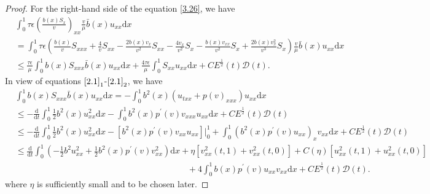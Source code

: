 \documentclass[10pt,reqno]{amsart}
\numberwithin{equation}{section}
\newcommand{\dif}{\mathrm{d}}
\begin{document}
\begin{proof}
For the right-hand side of the equation \eqref{3.26}, we have
\begin{align*}
&\int_0^1 \tau \epsilon \left(\frac{b(x)S_x}{v}\right)_{xx} \frac{v}{\mu} \bar b(x)u_{xx}\dif x \\
&=\int_0^1 \tau \epsilon \left( \frac{b(x)}{v}S_{xxx}+\frac{4}{v} S_{xx}-\frac{2 b(x) v_x}{v^2}S_{xx}-\frac{4v_x}{v^2}S_x-\frac{b(x)v_{xx}}{v^2}S_x+\frac{2 b(x)v_x^2}{v^3} S_x\right)\frac{v}{\mu} \bar b(x)u_{xx}\dif x\\
&\le \frac{\tau \epsilon}{\mu} \int_0^1 b(x) S_{xxx} \bar b(x) u_{xx} \dif x +\frac{4\tau \epsilon}{\mu} \int_0^1 S_{xx} u_{xx} \dif x +CE^\frac{1}{2}(t)\mathcal D(t).
\end{align*}
In view of  equations $\eqref{2.1}_1$-$\eqref{2.1}_2$, we have
\begin{align*}
&\int_0^1 b(x) S_{xxx} \bar b(x) u_{xx}\dif x=-\int_0^1 b^2(x)(u_{txx}+p(v)_{xxx})u_{xx}\dif x\\
&\le -\frac{\dif}{\dif t}\int_0^1 \frac{1}{2}b^2(x) u_{xx}^2\dif x-\int_0^1 b^2(x)p^\prime(v) v_{xxx}u_{xx} \dif x+CE^\frac{1}{2}(t)\mathcal D(t)\\
&\le -\frac{\dif}{\dif t} \int_0^1 \frac{1}{2} b^2(x)u_{xx}^2 \dif x-\left[b^2(x)p^\prime(v) v_{xx}u_{xx} \right]\big|_0^1+\int_0^1 (b^2(x)p^\prime(v) u_{xx})_x v_{xx}\dif x +CE^\frac{1}{2}(t)\mathcal D(t)\\
&\le \frac{\dif}{\dif t} \int_0^1 (-\frac{1}{2} b^2 u_{xx}^2+\frac{1}{2} b^2(x)p^\prime(v) v_{xx}^2)\dif x+\eta[ v_{xx}^2(t,1)+v_{xx}^2(t,0)]+C(\eta) [u_{xx}^2(t,1)+u_{xx}^2(t,0)]\\
&\qquad\qquad\qquad\qquad\qquad\qquad\qquad\qquad\qquad\qquad+4\int_0^1 b(x)p^\prime(v) u_{xx}v_{xx}\dif x+CE^\frac{1}{2}(t)\mathcal D(t).
\end{align*}
where $\eta$ is sufficiently small and to be chosen later.
 

\end{proof}
\end{document}
